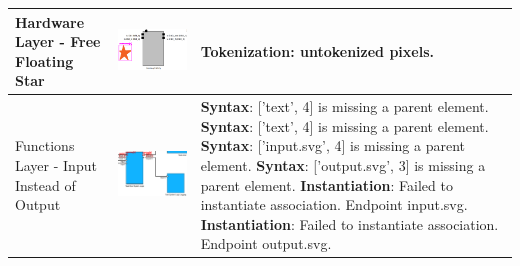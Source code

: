 \begin{longtable}{p{} >{\raggedright\arraybackslash}m{} >{\raggedright\arraybackslash}m{}}
    \midrule
    Hardware Layer - Free Floating Star & \includegraphics[width=\linewidth]{pictures/43_free_floating_star_output_clip.png} & \textbf{Tokenization}: untokenized pixels. \\
    \midrule
    Functions Layer - Input Instead of Output & \includegraphics[width=\linewidth]{pictures/50_input_instead_of_output_output_clip.png} & \textbf{Syntax}: ['text', 4] is missing a parent element. \newline
        \textbf{Syntax}: ['text', 4] is missing a parent element. \newline
        \textbf{Syntax}: ['input.svg', 4] is missing a parent element. \newline
        \textbf{Syntax}: ['output.svg', 3] is missing a parent element. \newline
        \textbf{Instantiation}: Failed to instantiate association. Endpoint input.svg. \newline
        \textbf{Instantiation}: Failed to instantiate association. Endpoint output.svg. \newline

\end{longtable}
